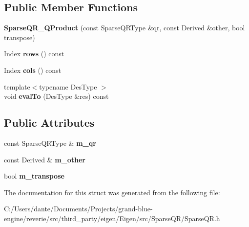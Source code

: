 \subsection*{Public Member Functions}
\begin{DoxyCompactItemize}
\item 
\mbox{\label{struct_eigen_1_1_sparse_q_r___q_product_a93450cb8c73ae375832fb21ea99055b6}} 
{\bfseries Sparse\+Q\+R\+\_\+\+Q\+Product} (const Sparse\+Q\+R\+Type \&qr, const Derived \&other, bool transpose)
\item 
\mbox{\label{struct_eigen_1_1_sparse_q_r___q_product_aff4a9c22b6a9f018ee5182aabfb6cd06}} 
Index {\bfseries rows} () const
\item 
\mbox{\label{struct_eigen_1_1_sparse_q_r___q_product_a040e2e2de371b4abdabaf28511f3bfa2}} 
Index {\bfseries cols} () const
\item 
\mbox{\label{struct_eigen_1_1_sparse_q_r___q_product_a320229d32cb114e0b3664aa7f4647930}} 
{\footnotesize template$<$typename Des\+Type $>$ }\\void {\bfseries eval\+To} (Des\+Type \&res) const
\end{DoxyCompactItemize}
\subsection*{Public Attributes}
\begin{DoxyCompactItemize}
\item 
\mbox{\label{struct_eigen_1_1_sparse_q_r___q_product_a2249a7f30c700a6ad40a762db3efb404}} 
const Sparse\+Q\+R\+Type \& {\bfseries m\+\_\+qr}
\item 
\mbox{\label{struct_eigen_1_1_sparse_q_r___q_product_ae2d110a2af0251b5a1e3b1a0fd258632}} 
const Derived \& {\bfseries m\+\_\+other}
\item 
\mbox{\label{struct_eigen_1_1_sparse_q_r___q_product_ab59e3f2d065f44d751ad02f3c12ddf30}} 
bool {\bfseries m\+\_\+transpose}
\end{DoxyCompactItemize}


The documentation for this struct was generated from the following file\+:\begin{DoxyCompactItemize}
\item 
C\+:/\+Users/dante/\+Documents/\+Projects/grand-\/blue-\/engine/reverie/src/third\+\_\+party/eigen/\+Eigen/src/\+Sparse\+Q\+R/Sparse\+Q\+R.\+h\end{DoxyCompactItemize}
